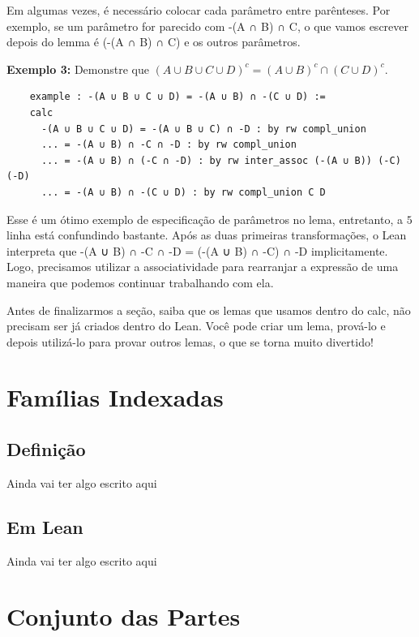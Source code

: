   Em algumas vezes, é necessário colocar cada parâmetro entre parênteses. Por exemplo, se um parâmetro for parecido com {\selectfont -(A ∩ B) ∩ C}, o que vamos escrever depois do lemma é {\selectfont (-(A ∩ B) ∩ C)} e os outros parâmetros.

  \textbf{Exemplo 3:} Demonstre que $(A \cup B \cup C \cup D)^c = (A \cup B)^c \cap (C \cup D)^c$.

  \begin{lstlisting}
    example : -(A ∪ B ∪ C ∪ D) = -(A ∪ B) ∩ -(C ∪ D) :=
    calc
      -(A ∪ B ∪ C ∪ D) = -(A ∪ B ∪ C) ∩ -D : by rw compl_union
      ... = -(A ∪ B) ∩ -C ∩ -D : by rw compl_union
      ... = -(A ∪ B) ∩ (-C ∩ -D) : by rw inter_assoc (-(A ∪ B)) (-C) (-D)
      ... = -(A ∪ B) ∩ -(C ∪ D) : by rw compl_union C D \end{lstlisting}

  Esse é um ótimo exemplo de especificação de parâmetros no lema, entretanto, a $5$ linha está confundindo bastante. Após as duas primeiras transformações, o Lean interpreta que {\selectfont -(A ∪ B) ∩ -C ∩ -D = (-(A ∪ B) ∩ -C) ∩ -D} implicitamente. Logo, precisamos utilizar a associatividade para rearranjar a expressão de uma maneira que podemos continuar trabalhando com ela.

  Antes de finalizarmos a seção, saiba que os lemas que usamos dentro do {\selectfont calc}, não precisam ser já criados dentro do Lean. Você pode criar um lema, prová-lo e depois utilizá-lo para provar outros lemas, o que se torna muito divertido!
\section{Famílias Indexadas}

  \subsection{Definição}
  Ainda vai ter algo escrito aqui

  \subsection{Em Lean}
  Ainda vai ter algo escrito aqui

\section{Conjunto das Partes}


